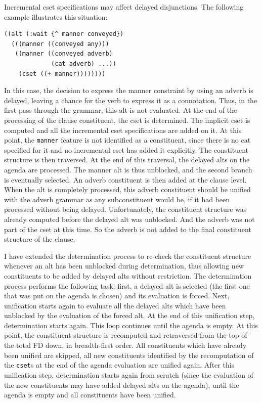 \documentclass[10pt,a4paper]{report}
\begin{document}
Incremental cset specifications may affect delayed disjunctions.  The
following example illustrates this situation:

\begin{lstlisting}[language=Lisp]
((alt (:wait {^ manner conveyed})
  (((manner ((conveyed any)))
   ((manner ((conveyed adverb)
             (cat adverb) ...))
    (cset ((+ manner))))))))
\end{lstlisting}

In this case, the decision to express the manner constraint by using an
adverb is delayed, leaving a chance for the verb to express it as a
connotation.  Thus, in the first pass through the grammar, this alt is not
evaluated.  At the end of the processing of the clause constituent, the
cset is determined.  The implicit cset is computed and all the incremental
cset specifications are added on it.  At this point, the {\tt manner} feature
is not identified as a constituent, since there is no cat specified for it
and no incremental cset has added it explicitly.  The constituent structure
is then traversed.  At the end of this traversal, the delayed alts on the
agenda are processed.  The manner alt is thus unblocked, and the second
branch is eventually selected.  An adverb constituent is then added at the
clause level.  When the alt is completely processed, this adverb
constituent should be unified with the adverb grammar as any subconstituent
would be, if it had been processed without being delayed.  Unfortunately,
the constituent structure was already computed before the delayed alt was
unblocked.  And the adverb was not part of the cset at this time.  So the
adverb is not added to the final constituent structure of the clause.

I have extended the determination process to re-check the constituent
structure whenever an alt has been unblocked during determination, thus
allowing new constituents to be added by delayed alts without restriction.
The determination process performs the following task: first, a delayed alt
is selected (the first one that was put on the agenda is chosen) and its
evaluation is forced.  Next, unification starts again to evaluate all the
delayed alts which have been unblocked by the evaluation of the forced alt.
At the end of this unification step, determination starts again.  This loop
continues until the agenda is empty.  At this point, the constituent
structure is recomputed and retraversed from the top of the total FD down,
in breadth-first order.  All constituents which have already been unified
are skipped, all new constituents identified by the recomputation of the
{\tt cset}s at the end of the agenda evaluation are unified again.  After
this unification step, determination starts again from scratch (since the
evaluation of the new constituents may have added delayed alts on the
agenda), until the agenda is empty and all constituents have been unified.
\end{document}
